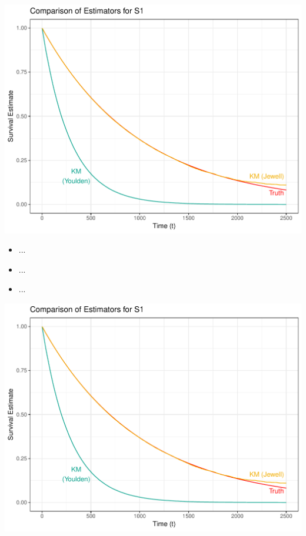 \documentclass[landscape,a0paper,fontscale=0.285]{baposter} %
\begin{document}
\begin{poster}
{\begin{multicols}{2}
\begin{center}
\vspace*{-0.5cm}
\includegraphics[scale=0.45]{s1_estim_compare}
\vspace{-1.75em}
\end{center}

\vspace{-1.75em}

\begin{itemize}
  \itemsep0.05pt
  \item ...
  \item ...
  \item ...
\end{itemize}

\begin{center}
\vspace*{-0.93cm}  %
\includegraphics[scale=0.45]{s1_estim_compare}
\vspace{-1.75em}
\end{center}


\end{multicols}}
\end{poster}
\end{document}
